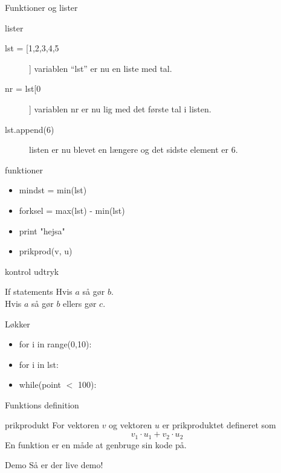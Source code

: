 \documentclass[12pt,t]{beamer}
\begin{document}
    \begin{frame}{Funktioner og lister}
        \begin{block}{lister}
            \begin{description}
                \item[lst = [1,2,3,4,5]] variablen ``lst'' er nu en liste med
                tal. \pause
                \item[nr = lst[0]] variablen nr er nu lig med det første tal i
                listen. \pause
                \item[lst.append(6)] listen er nu blevet en længere og det sidste
                element er $6$.
            \end{description}
        \end{block}
        \pause
        \begin{block}{funktioner}
            \begin{itemize}
                \item mindst = min(lst)
            \pause  \item forksel = max(lst) - min(lst)
            \pause  \item print "hejsa"
            \pause  \item prikprod(v, u)
            \end{itemize}
        \end{block}
    \end{frame}


    \begin{frame}[t]{kontrol udtryk}
        \begin{block}{If statements}
            Hvis $a$ så gør $b$. \\
            Hvis $a$ så gør $b$ ellers gør $c$.
        \end{block}
        \begin{block}{Løkker}
            \begin{itemize}
                \item for i in range(0,10):
                \pause \item for i in lst:
                \pause \item while(point $<$ 100):
            \end{itemize}
    \end{block}
    \end{frame}


    \begin{frame}{Funktions definition}
            \begin{block}{prikprodukt}
                For vektoren $v$ og vektoren $u$ er prikproduktet defineret som
                $$
                    v_1 \cdot u_1 + v_2 \cdot u_2
                $$
                En funktion er en måde at genbruge sin kode på.
            \end{block}
                \pause
            \begin{block}{Demo}
                 Så er der live demo!
            \end{block}
    \end{frame}
\end{document}
